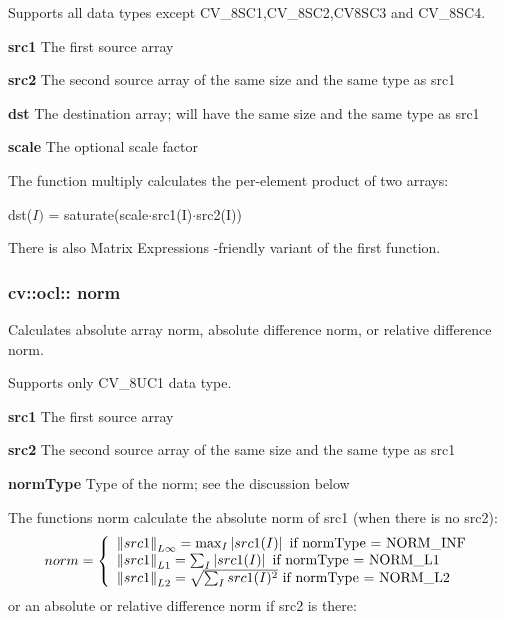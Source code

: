 \documentclass{article}
\begin{document}
Supports all data types except CV{\_}8SC1,CV{\_}8SC2,CV8SC3 and CV{\_}8SC4.

\textbf{src1} The first source array

\textbf{src2 } The second source array of the same size and the same type as
src1

\textbf{dst } The destination array; will have the same size and the same
type as src1

\textbf{scale} The optional scale factor

The function multiply calculates the per-element product of two arrays:

dst($I)$ = saturate(scale$\cdot $src1(I)$\cdot $src2(I))

There is also Matrix Expressions -friendly variant of the first function.

\newpage

\subsubsection{cv::ocl:: norm }
\label{subsubsec:mylabel24}
Calculates absolute array norm, absolute difference norm, or relative
difference norm.

Supports only CV{\_}8UC1 data type.

\textbf{src1 }The first source array

\textbf{src2 }The second source array of the same size and the same type as
src1

\textbf{normType }Type of the norm; see the discussion below

The functions norm calculate the absolute norm of src1 (when there is no
src2):
\[
norm=\left\{ {{\begin{array}{*{20}c}
 {\left\| {src1} \right\|_{L\infty } =\max _I \left| {src1(I)} \right|\mbox{
if normType = NORM\_INF}} \hfill \\
 {\left\| {src1} \right\|_{L1} =\sum _I \left| {src1(I)} \right|\mbox{ if
normType = NORM\_L1}} \hfill \\
 {\left\| {src1} \right\|_{L2} =\sqrt {\sum _I src1(I)^2} \mbox{ if normType
= NORM\_L2}} \hfill \\
\end{array} }} \right.
\]
or an absolute or relative difference norm if src2 is there:
\end{document}
